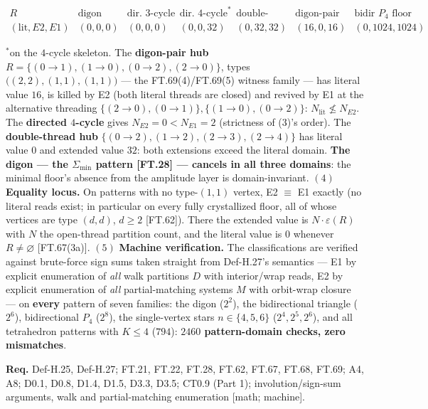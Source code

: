 \begin{theorem}
\[
\begin{array}{l|cccccc}
R & \text{digon} & \text{dir. }3\text{-cycle} & \text{dir. }4\text{-cycle}^{*} & \text{double-thread hub} & \text{digon-pair hub} & \text{bidir }P_4\text{ floor}\\
\hline
(\mathrm{lit},E2,E1) & (0,0,0) & (0,0,0) & (0,0,32) & (0,32,32) & (16,0,16) & (0,1024,1024)
\end{array}
\]

$^{*}$on the $4$-cycle skeleton. The \textbf{digon-pair hub} $R=\{(0{\to}1),(1{\to}0),(0{\to}2),(2{\to}0)\}$, types $\bigl((2,2),(1,1),(1,1)\bigr)$ — the FT.69(4)/FT.69(5) witness family — has literal value $16$, is killed by E2 (both literal threads are closed) and revived by E1 at the alternative threading $\{(2{\to}0),(0{\to}1)\},\{(1{\to}0),(0{\to}2)\}$: $N_{\mathrm{lit}}\not\le N_{E2}$. The \textbf{directed $4$-cycle} gives $N_{E2}=0<N_{E1}=2$ (strictness of (3)'s order). The \textbf{double-thread hub} $\{(0{\to}2),(1{\to}2),(2{\to}3),(2{\to}4)\}$ has literal value $0$ and extended value $32$: both extensions exceed the literal domain. \textbf{The digon — the $\Sigma_{\min}$ pattern [FT.28] — cancels in all three domains}: the minimal floor's absence from the amplitude layer is domain-invariant. $(4)$ \textbf{Equality locus.} On patterns with no type-$(1,1)$ vertex, E2 $\equiv$ E1 exactly (no literal reads exist; in particular on every fully crystallized floor, all of whose vertices are type $(d,d)$, $d\ge2$ [FT.62]). There the extended value is $N\cdot\varepsilon(R)$ with $N$ the open-thread partition count, and the literal value is $0$ whenever $R\ne\varnothing$ [FT.67(3a)]. $(5)$ \textbf{Machine verification.} The classifications are verified against brute-force sign sums taken straight from Def-H.27's semantics — E1 by explicit enumeration of \textit{all} walk partitions $D$ with interior/wrap reads, E2 by explicit enumeration of \textit{all} partial-matching systems $M$ with orbit-wrap closure — on \textbf{every} pattern of seven families: the digon ($2^2$), the bidirectional triangle ($2^6$), bidirectional $P_4$ ($2^8$), the single-vertex stars $n\in\{4,5,6\}$ ($2^4,2^5,2^6$), and all tetrahedron patterns with $K\le4$ ($794$): \textbf{$2460$ pattern-domain checks, zero mismatches}.

\textbf{Req.} Def-H.25, Def-H.27; FT.21, FT.22, FT.28, FT.62, FT.67, FT.68, FT.69; A4, A8; D0.1, D0.8, D1.4, D1.5, D3.3, D3.5; CT0.9 (Part 1); involution/sign-sum arguments, walk and partial-matching enumeration [math; machine].


\end{theorem}
